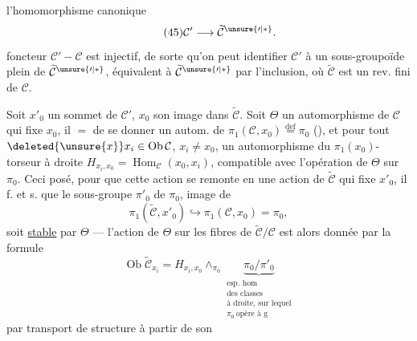 l'homomorphisme canonique
\[
\tag{45}\mathcal C'\longrightarrow\widetilde{\mathcal C}^{\unsure{\prime|*}}.
\]
 foncteur $\mathcal C'-\mathcal C$ est injectif, de sorte qu'on peut identifier $\mathcal C'$ à un sous-groupoïde plein de $\widetilde{\mathcal C}^{\unsure{\prime|*}}$, équivalent à $\widetilde{\mathcal C}^{\unsure{\prime|*}}$ par l'inclusion, où $\widetilde{\mathcal C}$ est un rev. fini de $\mathcal C$.

Soit $x'_0$ un sommet de $\mathcal C'$, $x_0$ son image dans $\widetilde{\mathcal C}$. Soit $\Theta$ un automorphisme de $\mathcal C$ qui fixe $x_0$, il   $=$ de se donner un autom. de  $\pi_1(\mathcal C,x_0)\overset{\mathrm{def}}{=}\pi_0$ (), et pour tout  $\deleted{\unsure{x}}x_i\in\operatorname{Ob}\mathcal C$, $x_i\ne x_0$, un automorphisme du $\pi_1(x_0)$-torseur à droite $H_{x_i,x_0}=\operatorname{Hom}_{\mathcal C}(x_0,x_i)$, compatible avec l'opération de $\Theta$ sur $\pi_0$. Ceci posé, pour que cette action se remonte en une action de $\widetilde{\mathcal C}$ qui fixe $x'_0$, il f. et s. que le sous-groupe $\pi'_0$ de $\pi_0$, image de 
\[
\pi_1(\widetilde{\mathcal C},x'_0)\hookrightarrow\pi_1(\mathcal C,x_0)=\pi_0,
\]
soit \uline{stable} par $\Theta$ --- l'action de $\Theta$ sur les fibres  de $\widetilde{\mathcal C}/\mathcal C$ est alors donnée par la formule
\[
\tag{45}\operatorname{Ob}\widetilde{\mathcal C}_{x_i}=H_{x_i,x_0}\wedge_{\pi_0}\underbrace{\pi_0/\pi'_0}_{\substack{\text{esp. hom}\\\text{des classes}\\\text{à droite, sur lequel}\\\pi_0\ \text{opère à g}}}
\]
par transport de structure à partir de son
